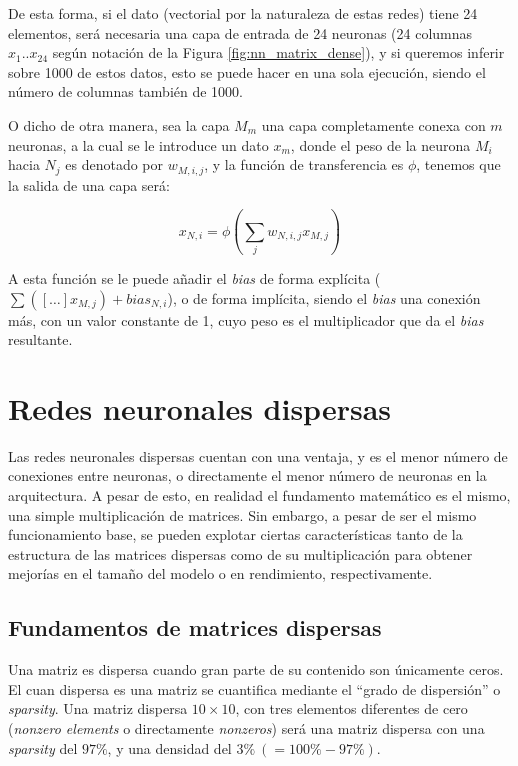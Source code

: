 De esta forma, si el dato (vectorial por la naturaleza de estas redes) tiene 24 elementos, será necesaria una capa de entrada de 24 neuronas (24 columnas $x_{1} .. x_{24}$ según notación de la Figura \ref{fig:nn_matrix_dense}), y si queremos inferir sobre 1000 de estos datos, esto se puede hacer en una sola ejecución, siendo el número de columnas también de 1000.

O dicho de otra manera, sea la capa $M_{m}$ una capa completamente conexa con $m$ neuronas, a la cual se le introduce un dato $x_{m}$, donde el peso de la neurona $M_{i}$ hacia $N_{j}$ es denotado por $w_{M,i,j}$, y la función de transferencia es $\phi$, tenemos que la salida de una capa será:

\begin{equation}
    x_{N,i} = \phi\left(\sum_{j}w_{N,i,j}x_{M,j}\right)\nonumber
    \label{eq:dense_nn_eq}
\end{equation}

A esta función se le puede añadir el \textit{bias} de forma explícita ($\sum\left([\dots] x_{M,j}\right) + bias_{N,i}$), o de forma implícita, siendo el \textit{bias} una conexión más, con un valor constante de 1, cuyo peso es el multiplicador que da el \textit{bias} resultante.

\section{Redes neuronales dispersas}
\label{sec:redes_reuronales_dispersas}
Las redes neuronales dispersas cuentan con una ventaja, y es el menor número de conexiones entre neuronas, o directamente el menor número de neuronas en la arquitectura. A pesar de esto, en realidad el fundamento matemático es el mismo, una simple multiplicación de matrices. Sin embargo, a pesar de ser el mismo funcionamiento base, se pueden explotar ciertas características tanto de la estructura de las matrices dispersas como de su multiplicación para obtener mejorías en el tamaño del modelo o en rendimiento, respectivamente.

\subsection{Fundamentos de matrices dispersas}
\label{ssec:fundamentos_matrices_dispersas}
Una matriz es dispersa cuando gran parte de su contenido son únicamente ceros. El cuan dispersa es una matriz se cuantifica mediante el ``grado de dispersión'' o \textit{sparsity}. Una matriz dispersa $10 \times 10$, con tres elementos diferentes de cero (\textit{nonzero elements} o directamente \textit{nonzeros}) será una matriz dispersa con una \textit{sparsity} del $97\%$, y una densidad del $3\% \:(=100\%-97\%)$.

